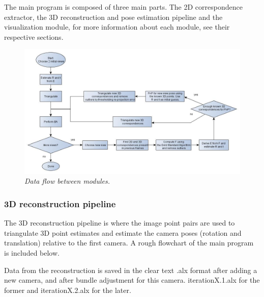 The main program is composed of three main parts. The 2D correspondence extractor, the 3D reconstruction and pose estimation pipeline and the visualization module, for more information about each module, see their respective sections.



\begin{figure}[htb]
	\centering
	\includegraphics[width=160mm]{images/pipeline.jpg}
	\caption{\textit{Data flow between modules.}}
	\label{fig:block_overview_fig}  %
\end{figure}



\subsubsection{3D reconstruction pipeline}
The 3D reconstruction pipeline is where the image point pairs are used to triangulate 3D point estimates and estimate the camera poses (rotation and translation) relative to the first camera. A rough flowchart of the main program is included below.

Data from the reconstruction is saved in the clear text .alx format after adding a new camera, and after bundle adjustment for this camera. iterationX.1.alx for the former and iterationX.2.alx for the later.